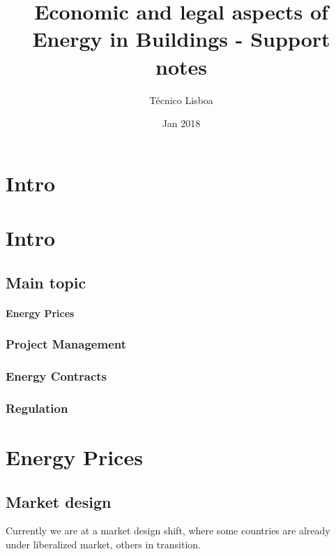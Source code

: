 \documentclass[]{book}
\title{Economic and legal aspects of Energy in Buildings - Support notes}
\author{Técnico Lisboa}
\date{Jan 2018}
\theoremstyle{definition}
\theoremstyle{definition}
\theoremstyle{definition}
\theoremstyle{remark}
\begin{document}
\maketitle

{
\setcounter{tocdepth}{1}
\tableofcontents
}
\chapter{Intro}\label{intro}

\chapter{Intro}\label{intro-1}

\section{Main topic}\label{main-topic}

\subsubsection{Energy Prices}\label{energy-prices}

\subsection{Project Management}\label{project-management}

\subsection{Energy Contracts}\label{energy-contracts}

\subsection{Regulation}\label{regulation}

\chapter{Energy Prices}\label{energy-prices-1}

\section{Market design}\label{market-design}

Currently we are at a market design shift, where some countries are
already under liberalized market, others in transition.
\end{document}

